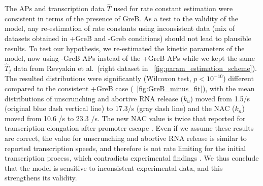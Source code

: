 
The APs \cite{hsu_initial_2006} and transcription data $\hat T$
\cite{revyakin_abortive_2006} used for rate constant estimation were
consistent in terms of the presence of GreB. As a test to the validity of the
model, any re-estimation of rate constants using inconsistent data (mix of
datasets obtained in +GreB and -Greb conditions) should not lead to plausible
results. To test our hypothesis, we re-estimated the kinetic parameters of the
model, now using -GreB APs \cite{hsu_initial_2006} instead of the +GreB APs
while we kept the same $\hat T_j$ data from Revyakin et al.\ (right dataset in
\FIG~\ref{fig:param_estimation_scheme}). The resulted distributions were
significantly (Wilcoxon test, $p<10^{-10}$) different compared to the
consistent +GreB case (\FIG~\ref{fig:GreB_minus_fit}), with the mean
distributions of unscrunching and abortive RNA release ($k_u$) moved from
1.5/s (original blue dash vertical line) to 17.3/s (gray dash line) and the
NAC ($k_n$) moved from 10.6 /s to 23.3 /s. The new NAC value is twice that
reported for transcription elongation after promoter escape
\cite{revyakin_abortive_2006}. Even if we assume these results are correct,
the value for unscrunching and abortive RNA release is similar to reported
transcription speeds, and therefore is not rate limiting for the initial
transcription process, which contradicts experimental findings
\cite{revyakin_abortive_2006, margeat_direct_2006}. We thus conclude that the
model is sensitive to inconsistent experimental data, and this strengthens its
validity.
